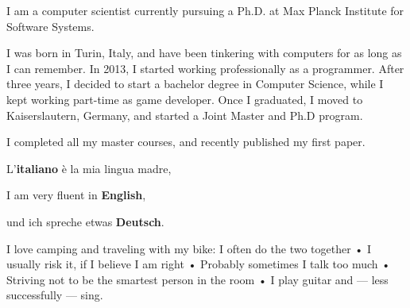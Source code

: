 


I am a computer scientist currently pursuing a Ph.D. at Max Planck Institute for Software Systems. 

I was born in Turin, Italy, and have been tinkering with computers for as long as I can remember. In 2013, I started working professionally as a programmer. After three years, I decided to start a bachelor degree in Computer Science, while I kept working part-time as game developer. Once I graduated, I moved to Kaiserslautern, Germany, and started a Joint Master and Ph.D program.

I completed all my master courses, and recently published my first paper.


L'\textbf{italiano} è la mia lingua madre,

I am very fluent in \textbf{English},

und ich spreche etwas \textbf{Deutsch}.


I love camping and traveling with my bike: I often do the two together • I usually risk it, if I believe I am right • Probably sometimes I talk too much • Striving not to be the smartest person in the room • I play guitar and --- less successfully --- sing.